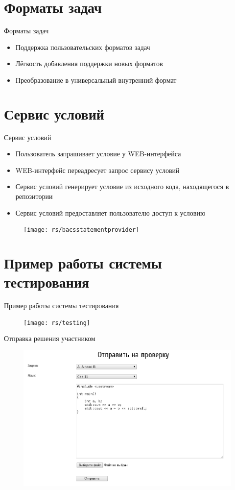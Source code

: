 \documentclass[xetex,mathserif,serif,10pt]{beamer}
\newenvironment{sframe}[2]{\section{#1}\begin{frame}[label=#2]{#1}}{\end{frame}}
\begin{document}
    \begin{sframe}{Форматы задач}{bacsproblem}
        \begin{itemize}
            \item Поддержка пользовательских форматов задач
            \item Лёгкость добавления поддержки новых форматов
            \item Преобразование в универсальный внутренний формат
        \end{itemize}
    \end{sframe}

    \begin{sframe}{Сервис условий}{bacsstatementprovider}
        \begin{itemize}
            \item Пользователь запрашивает условие у WEB-интерфейса
            \item WEB-интерфейс переадресует запрос сервису условий
            \item Сервис условий генерирует условие из исходного кода,
                находящегося в репозитории
            \item Сервис условий предоставляет пользователю доступ к условию
        \end{itemize}
        \begin{figure}
            \centering
            \texttt{[image: rs/bacsstatementprovider]}
        \end{figure}
    \end{sframe}

    \begin{sframe}{Пример работы системы тестирования}{testing}
        \begin{figure}
            \centering
            \texttt{[image: rs/testing]}
        \end{figure}
    \end{sframe}

    \begin{frame}{Отправка решения участником}
        \begin{figure}
            \centering
            \includegraphics[width=\columnwidth]{rs/sendsubmitok}
        \end{figure}
    \end{frame}
    
\end{document}
